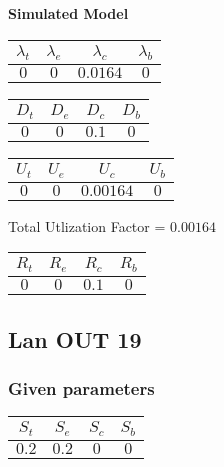 \documentclass{article}
\begin{document}
\begin{minipage}{0.5\textwidth}
\centering	\textbf{Simulated Model}
\begin{table}[H]
\centering
\begin{tabular}{@{}cccc@{}}
\toprule
$\lambda_t$ & $\lambda_e$ & $\lambda_c$ & $\lambda_b$\\
\midrule
$0$ & $0$ & $0.0164$ & $0$\\
\bottomrule
\end{tabular}
\end{table}
\begin{table}[H]
\centering
\begin{tabular}{@{}cccc@{}}
\toprule
$D_t$ & $D_e$ & $D_c$ & $D_b$\\
\midrule
$0$ & $0$ & $0.1$ & $0$\\
\bottomrule
\end{tabular}
\end{table}\begin{table}[H]
\centering
\begin{tabular}{@{}cccc@{}}
\toprule
$U_t$ & $U_e$ & $U_c$ & $U_b$\\
\midrule
$0$ & $0$ & $0.00164$ & $0$\\
\bottomrule
\end{tabular}
\end{table}
\centering Total Utlization Factor = $0.00164$
\begin{table}[H]
\centering
\begin{tabular}{@{}cccc@{}}
\toprule
$R_t$ & $R_e$ & $R_c$ & $R_b$\\
\midrule
$0$ & $0$ & $0.1$ & $0$\\
\bottomrule
\end{tabular}
\end{table}
\end{minipage}\subsection{Lan OUT 19}
\subsubsection{Given parameters}
\begin{table}[H]
\centering
\begin{tabular}{@{}cccc@{}}
\toprule
$S_t$ & $S_e$ & $S_c$ & $S_b$\\
\midrule
$0.2$ & $0.2$ & $0$ & $0$\\
\bottomrule
\end{tabular}
\end{table}
\end{document}
